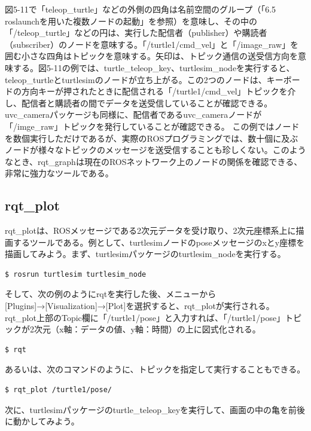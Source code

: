 図5-11で「teleop\_turtle」などの外側の四角は名前空間のグループ（「6.5 roslaunchを用いた複数ノードの起動」を参照）を意味し、その中の「/teleop\_turtle」などの円は、実行した配信者（publisher）や購読者（subscriber）のノードを意味する。「/turtle1/cmd\_vel」と「/image\_raw」を囲む小さな四角はトピックを意味する。矢印は、トピック通信の送受信方向を意味する。図5-11の例では、turtle\_teleop\_key、turtlesim\_nodeを実行すると、teleop\_turtleとturtlesimのノードが立ち上がる。この2つのノードは、キーボードの方向キーが押されたときに配信される「/turtle1/cmd\_vel」トピックを介し、配信者と購読者の間でデータを送受信していることが確認できる。uvc\_cameraパッケージも同様に、配信者であるuvc\_cameraノードが「/imge\_raw」トピックを発行していることが確認できる。
この例ではノードを数個実行しただけであるが、実際のROSプログラミングでは、数十個に及ぶノードが様々なトピックのメッセージを送受信することも珍しくない。このようなとき、rqt\_graphは現在のROSネットワーク上のノードの関係を確認できる、非常に強力なツールである。

\subsection{rqt\_plot}

rqt\_plotは、ROSメッセージである2次元データを受け取り、2次元座標系上に描画するツールである。例として、turtlesimノードのposeメッセージのxとy座標を描画してみよう。まず、turtlesimパッケージのturtlesim\_nodeを実行する。

\begin{lstlisting}[language=ROS]
$ rosrun turtlesim turtlesim_node
\end{lstlisting}

そして、次の例のようにrqtを実行した後、メニューから[Plugins]→[Visualization]→[Plot]を選択すると、rqt\_plotが実行される。 rqt\_plot上部のTopic欄に「/turtle1/pose」と入力すれば、「/turtle1/pose」トピックが2次元（x軸：データの値、y軸：時間）の上に図式化される。

\begin{lstlisting}[language=ROS]
$ rqt
\end{lstlisting}

あるいは、次のコマンドのように、トピックを指定して実行することもできる。

\begin{lstlisting}[language=ROS]
$ rqt_plot /turtle1/pose/
\end{lstlisting}

次に、turtlesimパッケージのturtle\_teleop\_keyを実行して、画面の中の亀を前後に動かしてみよう。

